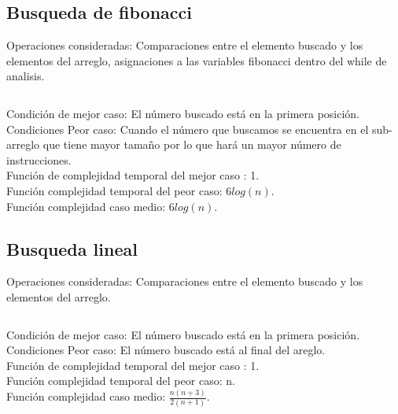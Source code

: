 \documentclass[12pt]{report}
\begin{document}
\subsection*{Busqueda de fibonacci}
Operaciones consideradas: Comparaciones entre el elemento buscado y los elementos del arreglo, asignaciones a las variables fibonacci dentro del while de analisis.\\
\inputminted[firstline = 55, lastline = 100]{C}{bfibonacci.c}
Condición de mejor caso: El número buscado está en la primera posición. \\
Condiciones Peor caso: Cuando el número que buscamos se encuentra en el sub-arreglo que tiene mayor tamaño por lo que hará un mayor número de instrucciones. \\
Función de complejidad temporal del mejor caso : 1.\\
Función complejidad temporal del peor caso: $6log(n)$. \\
Función complejidad caso medio: $6log(n)$.
\newpage
\subsection*{Busqueda lineal}
Operaciones consideradas: Comparaciones entre el elemento buscado y los elementos del arreglo.\\
\inputminted[firstline = 15, lastline = 22]{C}{blineal.c}
Condición de mejor caso: El número buscado está en la primera posición. \\
Condiciones Peor caso: El número buscado está al final del areglo. \\
Función de complejidad temporal del mejor caso : 1. \\
Función complejidad temporal del peor caso: n. \\
Función complejidad caso medio: $\frac{n(n+3)}{2(n+1)}$.\\
\end{document}
